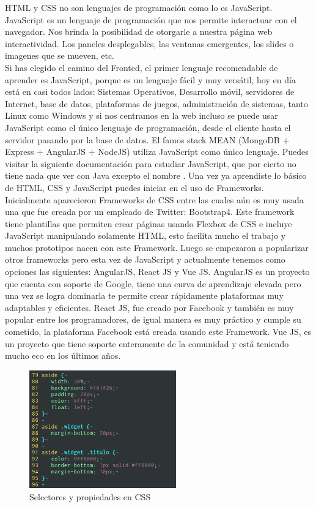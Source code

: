 \documentclass[twocolumns,a4paper]{IEEEtran}
\begin{document}
HTML y CSS no son lenguajes de programación como lo es JavaScript. JavaScript
es un lenguaje de programación que nos permite interactuar con el navegador.
Nos brinda la posibilidad de otorgarle a nuestra página web interactividad. Los
paneles desplegables, las ventanas emergentes, los slides o imagenes que se
mueven, etc.\\
Si has elegido el camino del Fronted, el primer lenguaje recomendable de
aprender es JavaScript, porque es un lenguaje fácil y muy versátil, hoy en día
está en casi todos lados: Sistemas Operativos, Desarrollo móvil, servidores de
Internet, base de datos, plataformas de juegos, administración de sistemas,
tanto Linux como Windows y si nos centramos en la web incluso se puede usar
JavaScript como el único lenguaje de programación, desde el cliente hasta el
servidor pasando por la base de datos. El famos stack MEAN (MongoDB + Express +
AngularJS + NodeJS) utiliza JavaScript como único lenguaje.
Puedes visitar la siguiente documentación para estudiar JavaScript, que por
cierto no tiene nada que ver con Java excepto el nombre
\cite{JavaScriptw3:2018:online} \cite{PluralsightJavaScript:2018:online}.
Una vez ya aprendiste lo básico de HTML, CSS y JavaScript puedes iniciar en el
uso de Frameworks.\\
Inicialmente aparecieron Frameworks de CSS entre las cuales
aún es muy usada una que fue creada por un empleado de Twitter: Bootstrap4.
Este framework tiene plantillas que permiten crear páginas usando Flexbox de
CSS e incluye JavaScript manipulando solamente HTML, esto facilita mucho el
trabajo y muchos prototipos nacen con este Framework.
Luego se empezaron a popularizar otros frameworks pero esta vez de JavaScript y
actualmente tenemos como opciones las siguientes: AngularJS, React JS y Vue JS.
AngularJS es un proyecto que cuenta con soporte de Google, tiene una curva de
aprendizaje elevada pero una vez se logra dominarla te permite crear
rápidamente plataformas muy adaptables y eficientes. React JS, fue creado por
Facebook y también es muy popular entre los programadores, de igual manera es
muy práctico y cumple su cometido, la plataforma Facebook está creada usando
este Framework. Vue JS, es un proyecto que tiene soporte enteramente de la
comunidad y está teniendo mucho eco en los últimos años.

\begin{figure}[ht]
   \centering
   \includegraphics[width=2.5in]{css_ejemplo}
   \caption{Selectores y propiedades en CSS}
   \label{fig:css_ejemplo}
\end{figure}
\end{document}
